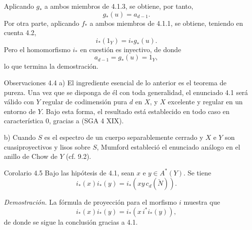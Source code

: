 Aplicando $g_*$ a ambos miembros de 4.1.3, se obtiene, por tanto,
\[
g_*(u)=a_{d-1}.
\tag{4.1.6}
\]
Por otra parte, aplicando $f_*$ a ambos miembros de 4.1.1, se obtiene, teniendo en cuenta 4.2,
\[
i_*(1_Y)=i_*g_*(u).
\tag{4.1.7}
\]
Pero el homomorfismo $i_*$ en cuestión es inyectivo, de donde
\[
a_{d-1}=g_*(u)=1_Y,
\]
lo que termina la demostración.

\begin{statement}{Observaciones 4.4}
a) El ingrediente esencial de lo anterior es el teorema de pureza. Una vez que se disponga de él con toda generalidad, el enunciado 4.1 será válido con $Y$ regular de codimensión pura $d$ en $X$, y $X$ excelente y regular en un entorno de $Y$. Bajo esta forma, el resultado está establecido en todo caso en característica $0$, gracias a (SGA 4 XIX).

b) Cuando $S$ es el espectro de un cuerpo separablemente cerrado y $X$ e $Y$ son cuasiproyectivos y lisos sobre $S$, Mumford estableció el enunciado análogo en el anillo de Chow de $Y$ (cf. 9.2).
\end{statement}

\begin{statement}{Corolario 4.5}
Bajo las hipótesis de 4.1, sean $x$ e $y\in A^*(Y)$. Se tiene
\[
i_*(x)i_*(y)=i_*(xy\,c_d(\check N)).
\]
\end{statement}

\emph{Demostración.} La fórmula de proyección para el morfismo $i$ muestra que
\[
i_*(x)i_*(y)=i_*(x\,i^*i_*(y)),
\]
de donde se sigue la conclusión gracias a 4.1.
